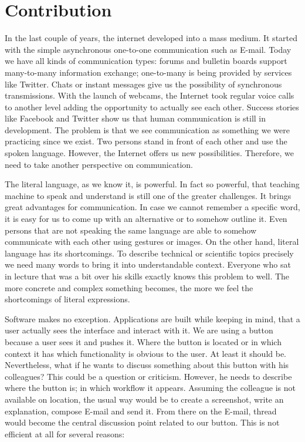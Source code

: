 \section{Contribution}\label{contribution}

In the last couple of years, the internet developed into a mass medium. It started with the simple asynchronous one-to-one communication such as E-mail. Today we have all kinds of communication types: forums and bulletin boards support many-to-many information exchange; one-to-many is being provided by services like Twitter. Chats or instant messages give us the possibility of synchronous transmissions. With the launch of webcams, the Internet took regular voice calls to another level adding the opportunity to actually see each other. Success stories like Facebook and Twitter show us that human communication is still in development. The problem is that we see communication as something we were practicing since we exist. Two persons stand in front of each other and use the spoken language. However, the Internet offers us new possibilities. Therefore, we need to take another perspective on communication. 

The literal language, as we know it, is powerful. In fact so powerful, that teaching machine to speak and understand is still one of the greater challenges. It brings great advantages for communication. In case we cannot remember a specific word, it is easy for us to come up with an alternative or to somehow outline it. Even persons that are not speaking the same language are able to somehow communicate with each other using gestures or images. On the other hand, literal language has its shortcomings. To describe technical or scientific topics precisely we need many words to bring it into understandable context. Everyone who sat in lecture that was a bit over his skills exactly knows this problem to well. The more concrete and complex something becomes, the more we feel the shortcomings of literal expressions. 

Software makes no exception. Applications are built while keeping in mind, that a user actually sees the interface and interact with it. We are using a button because a user sees it and pushes it. Where the button is located or in which context it has which functionality is obvious to the user. At least it should be. Nevertheless, what if he wants to discuss something about this button with his colleagues? This could be a question or criticism. However, he needs to describe where the button is; in which workflow it appears. Assuming the colleague is not available on location, the usual way would be to create a screenshot, write an explanation, compose E-mail and send it. From there on the E-mail, thread would become the central discussion point related to our button. This is not efficient at all for several reasons:


